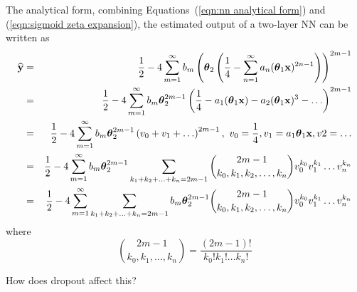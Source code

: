The analytical form, combining Equations~(\ref{eqn:nn analytical form}) and (\ref{eqn:sigmoid zeta expansion}), the estimated output of a two-layer NN can be written as
\begin{eqnarray}
	\widehat{\bold y} & = & \frac{1}{2} - 4 \sum_{m=1}^\infty b_m \left( \boldsymbol\theta_2 \left( \frac{1}{4} - \sum_{n=1}^\infty a_n (\boldsymbol\theta_1 {\bold x})^{2n-1} \right) \right)^{2m - 1} \\
		& = & \frac{1}{2} - 4 \sum_{m=1}^\infty b_m \boldsymbol\theta_2^{2m - 1} \left( \frac{1}{4} - a_1 (\boldsymbol\theta_1 {\bold x}) - a_2 (\boldsymbol\theta_1 {\bold x})^3 - \ldots \right)^{2m - 1} \nonumber \\
		& = & \frac{1}{2} - 4 \sum_{m=1}^\infty b_m \boldsymbol\theta_2^{2m - 1} \left(v_0 + v_1 + \ldots \right)^{2m - 1},\ v_0 = \frac{1}{4}, v_1 = a_1 \boldsymbol\theta_1 {\bold x}, v2 = \ldots \nonumber \\
		& = & \frac{1}{2} - 4 \sum_{m=1}^\infty b_m \boldsymbol\theta_2^{2m - 1} \sum_{k_1 + k_2 + \ldots + k_n = 2m - 1} \binom{2m-1}{k_0, k_1, k_2, \ldots, k_n} v_0^{k_0} v_1^{k_1} \ldots v_n^{k_n} \nonumber \\
		& = & \frac{1}{2} - 4 \sum_{m=1}^\infty \sum_{k_1 + k_2 + \ldots + k_n = 2m - 1} b_m \boldsymbol\theta_2^{2m - 1} \binom{2m-1}{k_0, k_1, k_2, \ldots, k_n} v_0^{k_0} v_1^{k_1} \ldots v_n^{k_n}
\end{eqnarray}
where
\[
	\binom{2m-1}{k_0, k_1, \ldots, k_n} = \frac{(2m-1)!}{k_0! k_1! \ldots k_n!}
\]

{\color{red} How does dropout affect this?}
